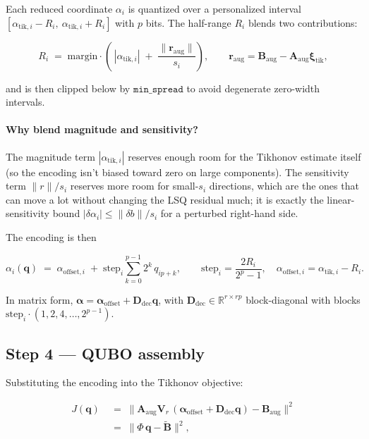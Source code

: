 \documentclass[8pt,a4paper]{article}
\newcommand{\R}{\mathbb{R}}
\newcommand{\bvec}[1]{\bm{#1}}
\newcommand{\Amat}{\bvec{A}}
\newcommand{\Bmat}{\bvec{B}}
\newcommand{\Vr}{\bvec{V}_r}
\newcommand{\Ddec}{\bvec{D}_{\mathrm{dec}}}
\theoremstyle{definition}
\theoremstyle{remark}
\begin{document}
Each reduced coordinate $\alpha_i$ is quantized over a personalized
interval $[\alpha_{\mathrm{tik},i} - R_i,\ \alpha_{\mathrm{tik},i} +
R_i]$ with $p$ bits. The half-range $R_i$ blends two contributions:

\begin{equation}
  R_i \;=\; \text{margin} \cdot
    \left(\,
      |\alpha_{\mathrm{tik},i}|
      \;+\;
      \frac{\|\bvec{r}_{\mathrm{aug}}\|}{s_i}
    \right),
\qquad
\bvec{r}_{\mathrm{aug}} = \Bmat_{\mathrm{aug}} - \Amat_{\mathrm{aug}}\bm\xi_{\mathrm{tik}},
\end{equation}

and is then clipped below by $\texttt{min\_spread}$ to avoid
degenerate zero-width intervals.

\paragraph{Why blend magnitude and sensitivity?}
The magnitude term $|\alpha_{\mathrm{tik},i}|$ reserves enough room
for the Tikhonov estimate itself (so the encoding isn't biased toward
zero on large components). The sensitivity term $\|r\| / s_i$
reserves more room for small-$s_i$ directions, which are the ones
that can move a lot without changing the LSQ residual much; it is
exactly the linear-sensitivity bound $|\delta \alpha_i| \leq \|\delta
b\| / s_i$ for a perturbed right-hand side.

The encoding is then

\begin{equation}
  \alpha_i(\bvec{q}) \;=\; \alpha_{\mathrm{offset},i}
     \;+\; \text{step}_i \sum_{k=0}^{p-1} 2^k\, q_{ip + k},
\qquad
\text{step}_i = \frac{2 R_i}{2^p - 1},
\quad
\alpha_{\mathrm{offset},i} = \alpha_{\mathrm{tik},i} - R_i.
\end{equation}

In matrix form, $\bm\alpha = \bm\alpha_{\mathrm{offset}} + \Ddec
\bvec{q}$, with $\Ddec \in \R^{r \times rp}$ block-diagonal with
blocks $\text{step}_i \cdot (1, 2, 4, \dots, 2^{p-1})$.

\subsection{Step 4 --- QUBO assembly}

Substituting the encoding into the Tikhonov objective:

\begin{align}
  J(\bvec{q})
   &\;=\; \|\Amat_{\mathrm{aug}} \Vr\,(\bm\alpha_{\mathrm{offset}} + \Ddec \bvec{q})
           - \Bmat_{\mathrm{aug}}\|^2 \\
   &\;=\; \|\Phi\,\bvec{q} - \tilde{\Bmat}\|^2,
\end{align}
\end{document}
